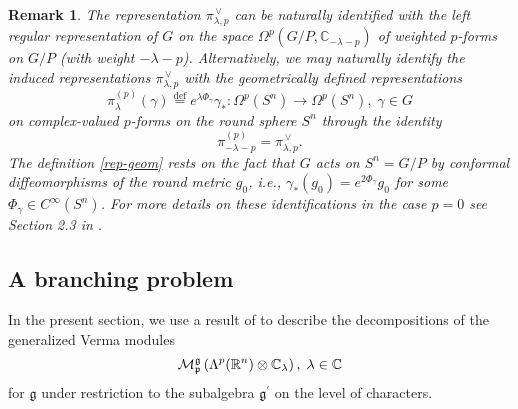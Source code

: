 \documentclass[a4paper,12pt,reqno]{amsart}
\newtheorem{bem}[theorem]{Remark}
\numberwithin{theorem}{subsection}
\numberwithin{equation}{section}
\begin{document}
\begin{bem}\label{rep-geo} The representation $\pi_{\lambda,p}^{{\,\vee}}$ can be naturally
identified with the left regular representation of $G$ on the space
$\Omega^p(G/P,{\mathbb{C}}_{-\lambda-p})$ of weighted $p$-forms on $G/P$ (with weight
$-\lambda-p$). Alternatively, we may naturally identify the induced
representations $\pi_{\lambda,p}^{{\,\vee}}$ with the geometrically defined
representations
\begin{equation}\label{rep-geom}
   \pi_\lambda^{(p)}(\gamma) {\stackrel{\text{def}}{=}} e^{\lambda \Phi_\gamma} \gamma_*:
   \Omega^p (S^n) \to \Omega^p(S^n), \; \gamma \in G
\end{equation}
on complex-valued $p$-forms on the round sphere $S^n$ through the identity
\begin{equation}\label{rep-relation}
   \pi_{-\lambda-p}^{(p)} = \pi_{\lambda,p}^{{\,\vee}}.
\end{equation}
The definition \eqref{rep-geom} rests on the fact that $G$ acts on $S^n = G/P$
by conformal diffeomorphisms of the round metric $g_0$, i.e., $\gamma_*(g_0) =
e^{2\Phi_\gamma} g_0$ for some $\Phi_\gamma \in C^\infty(S^n)$. For more
details on these identifications in the case $p=0$ see Section 2.3 in
\cite{Juhl}.
\end{bem}

\subsection{A branching problem}\label{charident}

In the present section, we use a result of \cite{ko} to describe the
decompositions of the generalized Verma modules
$$
   {\fam2 M}^{{\mathfrak g}}_{{\mathfrak p}}\left(\Lambda^p({\mathbb{R}}^n) \otimes {\mathbb{C}}_\lambda \right), \; \lambda \in {\mathbb{C}}
$$
for ${{\mathfrak g}}$ under restriction to the subalgebra ${{\mathfrak g}}^\prime$ on the level of
characters.
\end{document}
